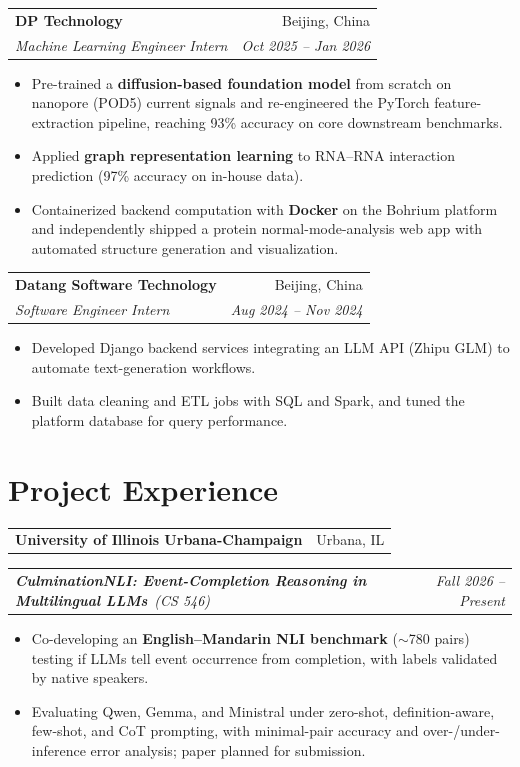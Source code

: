 \documentclass[10pt, letterpaper]{article}
\makeatletter
\newcommand{\entry}[4]{%
    \noindent
    \begin{tabularx}{\textwidth}{@{}>{\raggedright\arraybackslash}X r@{}}
        \textbf{#1} & #2 \\
        \textit{#3} & \textit{#4}
    \end{tabularx}\par\vspace{-1pt}%
}
\newcommand{\inst}[2]{%
    \noindent
    \begin{tabularx}{\textwidth}{@{}>{\raggedright\arraybackslash}X r@{}}
        \textbf{#1} & #2
    \end{tabularx}\par\vspace{-1pt}%
}
\newcommand{\proj}[3]{%
    \noindent
    \begin{tabularx}{\textwidth}{@{}>{\raggedright\arraybackslash}X r@{}}
        \hspace{0.6em}\textbf{\textit{#1}}\ \textit{#2} & \textit{#3}
    \end{tabularx}\par\vspace{-1pt}%
}
\makeatother
\begin{document}
\entry{DP Technology}{Beijing, China}
      {Machine Learning Engineer Intern}{Oct 2025 -- Jan 2026}
\begin{itemize}
    \item Pre-trained a \textbf{diffusion-based foundation model} from scratch on nanopore (POD5) current signals and
          re-engineered the PyTorch feature-extraction pipeline, reaching 93\% accuracy on core downstream benchmarks.
    \item Applied \textbf{graph representation learning} to RNA--RNA interaction prediction (97\% accuracy on in-house data).
    \item Containerized backend computation with \textbf{Docker} on the Bohrium platform and independently shipped a protein
          normal-mode-analysis web app with automated structure generation and visualization.
\end{itemize}

\entry{Datang Software Technology}{Beijing, China}
      {Software Engineer Intern}{Aug 2024 -- Nov 2024}
\begin{itemize}
    \item Developed Django backend services integrating an LLM API (Zhipu GLM) to automate text-generation workflows.
    \item Built data cleaning and ETL jobs with SQL and Spark, and tuned the platform database for query performance.
\end{itemize}

\section{Project Experience}

\inst{University of Illinois Urbana-Champaign}{Urbana, IL}
\proj{CulminationNLI: Event-Completion Reasoning in Multilingual LLMs}{(CS 546)}{Fall 2026 -- Present}
\begin{itemize}[leftmargin=2em]
    \item Co-developing an \textbf{English--Mandarin NLI benchmark} ($\sim$780 pairs) testing if LLMs tell event
          occurrence from completion, with labels validated by native speakers.
    \item Evaluating Qwen, Gemma, and Ministral under zero-shot, definition-aware, few-shot, and CoT prompting, with
          minimal-pair accuracy and over-/under-inference error analysis; paper planned for submission.
\end{itemize}
\end{document}
